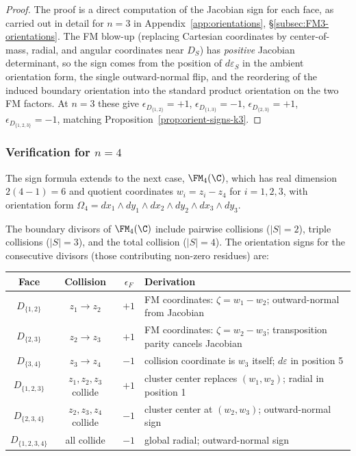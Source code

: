 \begin{proof}
The proof is a direct computation of the Jacobian sign for each face, as carried out in detail for $n = 3$ in Appendix~\ref{app:orientations}, \S\ref{subsec:FM3-orientations}. The FM blow-up (replacing Cartesian coordinates by center-of-mass, radial, and angular coordinates near $D_S$) has \emph{positive} Jacobian determinant, so the sign comes from the position of $d\varepsilon_S$ in the ambient orientation form, the single outward-normal flip, and the reordering of the induced boundary orientation into the standard product orientation on the two FM factors. At $n=3$ these give $\epsilon_{D_{\{1,2\}}} = +1$, $\epsilon_{D_{\{1,3\}}} = -1$, $\epsilon_{D_{\{2,3\}}} = +1$, $\epsilon_{D_{\{1,2,3\}}} = -1$, matching Proposition~\ref{prop:orient-signs-k3}.
\end{proof}

\subsubsection{\texorpdfstring{Verification for $n=4$}{Verification for n=4}}

The sign formula extends to the next case, $\FM_4(\C)$, which has real dimension $2(4-1) = 6$ and quotient coordinates $w_i = z_i - z_4$ for $i = 1,2,3$, with orientation form $\Omega_4 = dx_1 \wedge dy_1 \wedge dx_2 \wedge dy_2 \wedge dx_3 \wedge dy_3$.

The boundary divisors of $\FM_4(\C)$ include pairwise collisions ($|S| = 2$), triple collisions ($|S| = 3$), and the total collision ($|S| = 4$). The orientation signs for the consecutive divisors (those contributing non-zero residues) are:

\medskip
\begin{center}
\renewcommand{\arraystretch}{1.3}
\begin{tabular}{c|c|c|l}
\textbf{Face} & \textbf{Collision} & $\epsilon_F$ & \textbf{Derivation} \\
\hline
$D_{\{1,2\}}$ & $z_1\to z_2$ & $+1$ & FM coordinates: $\zeta = w_1 - w_2$; outward-normal from Jacobian \\
$D_{\{2,3\}}$ & $z_2\to z_3$ & $+1$ & FM coordinates: $\zeta = w_2 - w_3$; transposition parity cancels Jacobian \\
$D_{\{3,4\}}$ & $z_3\to z_4$ & $-1$ & collision coordinate is $w_3$ itself; $d\varepsilon$ in position 5 \\
$D_{\{1,2,3\}}$ & $z_1,z_2,z_3$ collide & $+1$ & cluster center replaces $(w_1,w_2)$; radial in position 1 \\
$D_{\{2,3,4\}}$ & $z_2,z_3,z_4$ collide & $-1$ & cluster center at $(w_2,w_3)$; outward-normal sign \\
$D_{\{1,2,3,4\}}$ & all collide & $-1$ & global radial; outward-normal sign
\end{tabular}
\end{center}

